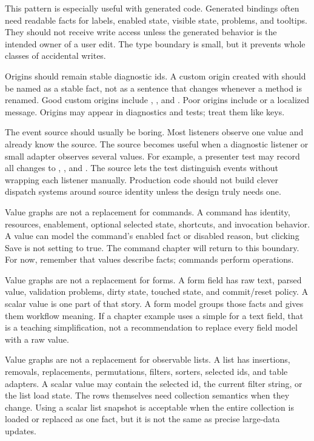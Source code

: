 This pattern is especially useful with generated code. Generated bindings often
need readable facts for labels, enabled state, visible state, problems, and
tooltips. They should not receive write access unless the generated behavior is
the intended owner of a user edit. The type boundary is small, but it prevents
whole classes of accidental writes.

Origins should remain stable diagnostic ids. A custom origin created with
 should be named as a stable fact, not as a sentence that
changes whenever a method is renamed. Good custom origins include
, , and .
Poor origins include  or a localized message. Origins may
appear in diagnostics and tests; treat them like keys.

The event source should usually be boring. Most listeners observe one value and
already know the source. The source becomes useful when a diagnostic listener or
small adapter observes several values. For example, a presenter test may record
all changes to , , and . The source lets
the test distinguish events without wrapping each listener manually. Production
code should not build clever dispatch systems around source identity unless the
design truly needs one.

Value graphs are not a replacement for commands. A command has identity,
resources, enablement, optional selected state, shortcuts, and invocation
behavior. A value can model the command's enabled fact or disabled reason, but
clicking Save is not setting  to true. The command chapter will
return to this boundary. For now, remember that values describe facts; commands
perform operations.

Value graphs are not a replacement for forms. A form field has raw text, parsed
value, validation problems, dirty state, touched state, and commit/reset policy.
A scalar value is one part of that story. A form model groups those facts and
gives them workflow meaning. If a chapter example uses a simple
 for a text field, that is a teaching simplification,
not a recommendation to replace every field model with a raw value.

Value graphs are not a replacement for observable lists. A list has insertions,
removals, replacements, permutations, filters, sorters, selected ids, and table
adapters. A scalar value may contain the selected id, the current filter string,
or the list load state. The rows themselves need collection semantics when they
change. Using a scalar list snapshot is acceptable when the entire collection is
loaded or replaced as one fact, but it is not the same as precise large-data
updates.


